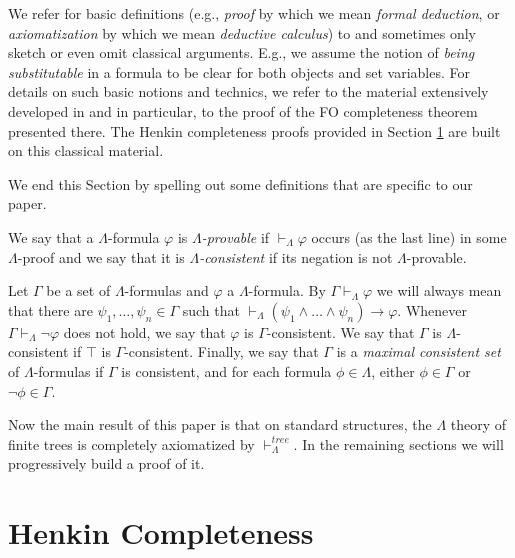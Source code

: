 \documentclass{LMCS}
\newcommand{\fo}{\textsf{FO}\xspace}
\begin{document}
We refer for basic definitions (e.g., \emph{proof} by which we mean \emph{formal deduction}, or \emph{axiomatization} by which we mean \emph{deductive calculus}) to \cite{Enderton} and sometimes only sketch or even omit classical arguments. E.g., we assume the notion of \emph{being substitutable} in a formula
to be clear for both objects and set variables. For details on such
basic notions and technics, we refer to the material extensively
developed in \cite{Enderton} and in particular, to the proof of the \fo
completeness theorem presented there. The Henkin completeness proofs
provided in Section \ref{sec3} are built on this classical material. 

We end this Section by spelling out some definitions that are specific to our paper.

\begin{defi}
We say that a $\Lambda$-formula $\varphi$ is \emph{$\Lambda$-provable} if $\vdash_\Lambda \varphi$
occurs (as the last line) in some $\Lambda$-proof and we say that it is \emph{$\Lambda$-consistent} if its negation is not $\Lambda$-provable. 

Let $\Gamma$ be a set of $\Lambda$-formulas and $\varphi$ a
$\Lambda$-formula. By $\Gamma \vdash_\Lambda \varphi$ we will
always mean that there are $\psi_1,\ldots, \psi_n \in \Gamma$ such
that $\vdash_\Lambda (\psi_1 \wedge \ldots \wedge \psi_n)
\rightarrow \varphi$. Whenever $\Gamma \vdash_\Lambda \neg \varphi$
does not hold, we say that $\varphi$ is $\Gamma$-consistent. We say that $\Gamma$ is $\Lambda$-consistent if $\top$ is $\Gamma$-consistent.
Finally, we say that $\Gamma$ is a \emph{maximal consistent set} of $\Lambda$-formulas if 
$\Gamma$ is consistent, and for each formula $\phi\in\Lambda$, either
$\phi\in\Gamma$ or $\neg\phi\in\Gamma$.

\label{defax}
\end{defi}

Now the main result of this paper is that on standard structures,
the $\Lambda$ theory of finite trees is completely axiomatized by
$\vdash_\Lambda^{tree}$. In the remaining sections we will
progressively build a proof of it.





\section{Henkin Completeness}
\label{sec3}
\end{document}

